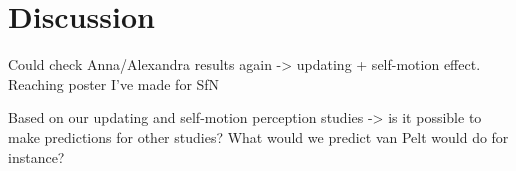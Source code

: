 \section{Discussion}



Could check Anna/Alexandra results again -> updating + self-motion effect.
Reaching poster I've made for SfN


Based on our updating and self-motion perception studies -> is it possible to make predictions for other studies?
What would we predict van Pelt would do for instance?


